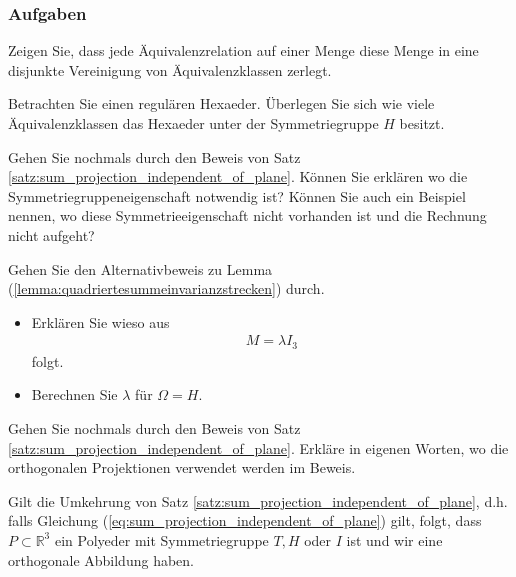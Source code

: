 \subsubsection{Aufgaben}
\begin{exercise} [Äquivalenzklassen] \label{ex:äquivalenzklassen}
Zeigen Sie, dass jede Äquivalenzrelation auf einer Menge diese Menge in eine disjunkte Vereinigung von Äquivalenzklassen zerlegt.
\end{exercise}

\begin{exercise}  \label{ex:äquivalenzklassen_regulärer_hexaeder}
Betrachten Sie einen regulären Hexaeder. Überlegen Sie sich wie viele Äquivalenzklassen das Hexaeder unter der Symmetriegruppe $H$ besitzt.
\end{exercise}




\begin{exercise}[Symmetrie] \label{ex:notwendigkeitsymmetrie}
Gehen Sie nochmals durch den Beweis von Satz \ref{satz:sum_projection_independent_of_plane}. Können Sie erklären wo die Symmetriegruppeneigenschaft notwendig ist? Können Sie auch ein Beispiel nennen, wo diese Symmetrieeigenschaft nicht vorhanden ist und die Rechnung nicht aufgeht?
\end{exercise}

\begin{exercise} \label{ex:alternativbeweislemma}
Gehen Sie den Alternativbeweis zu Lemma (\ref{lemma:quadriertesummeinvarianzstrecken}) durch. \begin{itemize}
    \item[a)] Erklären Sie wieso aus 
\begin{align}
    M = \lambda I_3 \nonumber
\end{align}
folgt.
\item[b)] Berechnen Sie $\lambda$ für $\Omega=H$.
\end{itemize}
\end{exercise}

\begin{exercise} \label{ex:notwendigkeitorthogonaleprojektionen}
Gehen Sie nochmals durch den Beweis von Satz \ref{satz:sum_projection_independent_of_plane}. Erkläre in eigenen Worten, wo die orthogonalen Projektionen verwendet werden im Beweis.
\end{exercise}
\begin{exercise}[Umkehrung] \label{ex:umkehrung_satz}
Gilt die Umkehrung von Satz \ref{satz:sum_projection_independent_of_plane}, d.h. falls Gleichung (\ref{eq:sum_projection_independent_of_plane}) gilt, folgt, dass $P \subset \mathbb{R}^3$ ein Polyeder mit Symmetriegruppe $T,H$ oder $I$ ist und wir eine orthogonale Abbildung haben.
\end{exercise}


